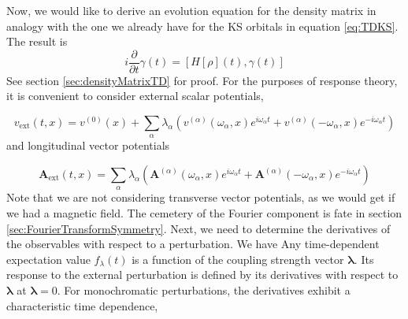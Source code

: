 Now, we would like to derive an evolution equation for the density matrix in analogy with the one we already have for the KS orbitals in equation \ref{eq:TDKS}. The result is
\begin{equation}
i \frac{\partial}{\partial t} \gamma(t) = \left[ H[\rho](t), \gamma(t) \right] 
\label{eq:densityMatrixTD}
\end{equation}
See section \ref{sec:densityMatrixTD} for proof.
For the purposes of response theory, it is convenient to consider external scalar potentials,


\begin{equation}
v_{\mathrm{ext}}(t, x)= v^{(0)}(x)+\sum_{\alpha} \lambda_{\alpha}\left(v^{(\alpha)}\left(\omega_{\alpha}, x\right) e^{i \omega_{\alpha} t}+v^{(\alpha)}\left(-\omega_{\alpha}, x\right) e^{-i \omega_{\alpha} t}\right)
\end{equation}
and longitudinal vector potentials


\begin{equation}
\mathbf{A}_{\mathrm{ext}}(t, x)= \sum_{\alpha} \lambda_{\alpha}\left(\mathbf{A}^{(\alpha)}\left(\omega_{\alpha}, x\right) e^{i \omega_{\alpha} t}+\mathbf{A}^{(\alpha)}\left(-\omega_{\alpha}, x\right) e^{-i \omega_{\alpha} t}\right)
\end{equation}
Note that we are not considering transverse vector potentials, as we would get if we had a magnetic field. The cemetery of the Fourier component is fate in section \ref{sec:FourierTransformSymmetry}. Next, we need to determine the derivatives of the observables with respect to a perturbation. We have
Any time-dependent expectation value $f_{\lambda}(t)$ is a function of the coupling strength vector $\boldsymbol{\lambda}$. Its response to the external perturbation is defined by its derivatives with respect to $\boldsymbol{\lambda}$ at $\boldsymbol{\lambda}=0$. For monochromatic perturbations, the derivatives exhibit a characteristic time dependence,


